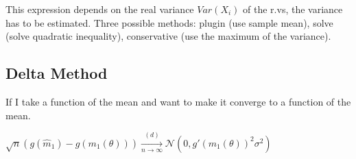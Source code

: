 This expression depends on the real variance $Var(X_i)$ of the r.vs, the variance has to be estimated. Three possible methods: plugin (use sample mean), solve (solve quadratic inequality), conservative (use the maximum of the variance).\\

\subsection*{Delta Method}

If I take a function of the mean and want to make it converge to a function of the mean. 

$\sqrt{n}(g(\widehat{m}_1) - g(m_1(\theta ))) \xrightarrow [n \to \infty ]{(d)} \mathcal{N}(0, g'(m_1(\theta ))^2 \sigma ^2)$

